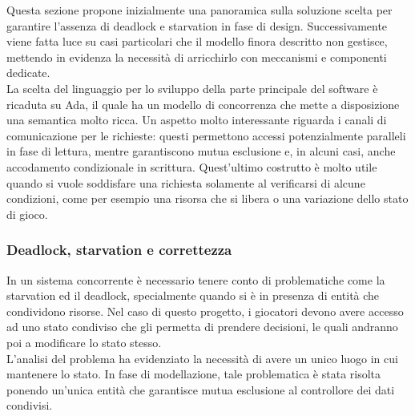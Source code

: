 Questa sezione propone inizialmente una panoramica sulla soluzione scelta per garantire l'assenza di deadlock e starvation in fase di design. Successivamente viene fatta luce su casi particolari che il modello finora descritto non gestisce, mettendo in evidenza la necessità di arricchirlo con meccanismi e componenti dedicate.\\

La scelta del linguaggio per lo sviluppo della parte principale del software è ricaduta su Ada, il quale ha un modello di concorrenza che mette a disposizione una semantica molto ricca. Un aspetto molto interessante riguarda i canali di comunicazione per le richieste: questi permettono accessi potenzialmente paralleli in fase di lettura, mentre  garantiscono mutua esclusione e, in alcuni casi, anche accodamento condizionale in scrittura. Quest'ultimo costrutto è molto utile quando si vuole soddisfare una richiesta solamente al verificarsi di alcune condizioni, come per esempio una risorsa che si libera o una variazione dello stato di gioco.

\subsubsection{Deadlock, starvation e correttezza}
\label{sec:analisi_concorrenza_deadlock}

In un sistema concorrente è necessario tenere conto di problematiche come la starvation ed il deadlock, specialmente quando si è in presenza di entità che condividono risorse. Nel caso di questo progetto, i giocatori devono avere accesso ad uno stato condiviso che gli permetta di prendere decisioni, le quali andranno poi a modificare lo stato stesso.\\

L'analisi del problema ha evidenziato la necessità di avere un unico luogo in cui mantenere lo stato. In fase di modellazione, tale problematica è stata risolta ponendo un'unica entità che garantisce mutua esclusione al controllore dei dati condivisi.\\

